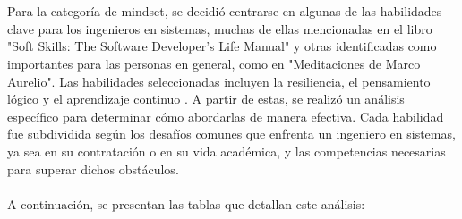\\ \\
Para la categoría de mindset, se decidió centrarse en algunas de las habilidades clave para los ingenieros en sistemas, muchas de ellas mencionadas en el libro "Soft Skills: The Software Developer's Life Manual" y otras identificadas como importantes para las personas en general, como en "Meditaciones de Marco Aurelio". Las habilidades seleccionadas incluyen la resiliencia, el pensamiento lógico y el aprendizaje continuo . A partir de estas, se realizó un análisis específico para determinar cómo abordarlas de manera efectiva. Cada habilidad fue subdividida según los desafíos comunes que enfrenta un ingeniero en sistemas, ya sea en su contratación o en su vida académica, y las competencias necesarias para superar dichos obstáculos.
\\ \\
A continuación, se presentan las tablas que detallan este análisis:


